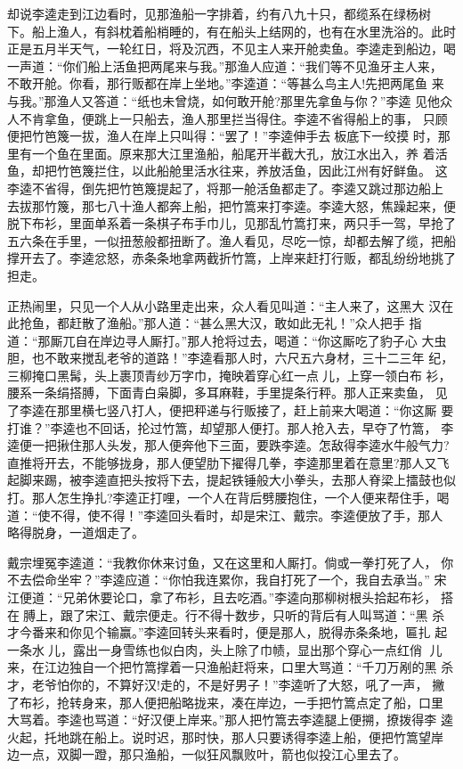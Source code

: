 却说李逵走到江边看时，见那渔船一字排着，约有八九十只，都缆系在绿杨树
下。船上渔人，有斜枕着船梢睡的，有在船头上结网的，也有在水里洗浴的。此时
正是五月半天气，一轮红日，将及沉西，不见主人来开舱卖鱼。李逵走到船边，喝
一声道：“你们船上活鱼把两尾来与我。”那渔人应道：“我们等不见渔牙主人来，
不敢开舱。你看，那行贩都在岸上坐地。”李逵道：“等甚么鸟主人!先把两尾鱼
来与我。”那渔人又答道：“纸也未曾烧，如何敢开舱?那里先拿鱼与你？”李逵
见他众人不肯拿鱼，便跳上一只船去，渔人那里拦当得住。李逵不省得船上的事，
只顾便把竹笆篾一拔，渔人在岸上只叫得：“罢了！”李逵伸手去板底下一绞摸
时，那里有一个鱼在里面。原来那大江里渔船，船尾开半截大孔，放江水出入，养
着活鱼，却把竹笆篾拦住，以此船舱里活水往来，养放活鱼，因此江州有好鲜鱼。
这李逵不省得，倒先把竹笆篾提起了，将那一舱活鱼都走了。李逵又跳过那边船上
去拔那竹篾，那七八十渔人都奔上船，把竹篙来打李逵。李逵大怒，焦躁起来，便
脱下布衫，里面单系着一条棋子布手巾儿，见那乱竹篙打来，两只手一驾，早抢了
五六条在手里，一似扭葱般都扭断了。渔人看见，尽吃一惊，却都去解了缆，把船
撑开去了。李逵忿怒，赤条条地拿两截折竹篙，上岸来赶打行贩，都乱纷纷地挑了
担走。

正热闹里，只见一个人从小路里走出来，众人看见叫道：“主人来了，这黑大
汉在此抢鱼，都赶散了渔船。”那人道：“甚么黑大汉，敢如此无礼！”众人把手
指道：“那厮兀自在岸边寻人厮打。”那人抢将过去，喝道：“你这厮吃了豹子心
大虫胆，也不敢来搅乱老爷的道路！”李逵看那人时，六尺五六身材，三十二三年
纪，三柳掩口黑髯，头上裹顶青纱万字巾，掩映着穿心红一点儿，上穿一领白布
衫，腰系一条绢搭膊，下面青白枭脚，多耳麻鞋，手里提条行秤。那人正来卖鱼，
见了李逵在那里横七竖八打人，便把秤递与行贩接了，赶上前来大喝道：“你这厮
要打谁？”李逵也不回话，抡过竹篙，却望那人便打。那人抢入去，早夺了竹篙，
李逵便一把揪住那人头发，那人便奔他下三面，要跌李逵。怎敌得李逵水牛般气力?
直推将开去，不能够拢身，那人便望肋下擢得几拳，李逵那里着在意里?那人又飞
起脚来踢，被李逵直把头按将下去，提起铁锤般大小拳头，去那人脊梁上擂鼓也似
打。那人怎生挣扎?李逵正打哩，一个人在背后劈腰抱住，一个人便来帮住手，喝
道：“使不得，使不得！”李逵回头看时，却是宋江、戴宗。李逵便放了手，那人
略得脱身，一道烟走了。

戴宗埋冤李逵道：“我教你休来讨鱼，又在这里和人厮打。倘或一拳打死了人，
你不去偿命坐牢？”李逵应道：“你怕我连累你，我自打死了一个，我自去承当。”
宋江便道：“兄弟休要论口，拿了布衫，且去吃酒。”李逵向那柳树根头拾起布衫，
搭在膊上，跟了宋江、戴宗便走。行不得十数步，只听的背后有人叫骂道：“黑
杀才今番来和你见个输赢。”李逵回转头来看时，便是那人，脱得赤条条地，匾扎
起一条水儿，露出一身雪练也似白肉，头上除了巾帻，显出那个穿心一点红俏
儿来，在江边独自一个把竹篙撑着一只渔船赶将来，口里大骂道：“千刀万剐的黑
杀才，老爷怕你的，不算好汉!走的，不是好男子！”李逵听了大怒，吼了一声，
撇了布衫，抢转身来，那人便把船略拢来，凑在岸边，一手把竹篙点定了船，口里
大骂着。李逵也骂道：“好汉便上岸来。”那人把竹篙去李逵腿上便搠，撩拨得李
逵火起，托地跳在船上。说时迟，那时快，那人只要诱得李逵上船，便把竹篙望岸
边一点，双脚一蹬，那只渔船，一似狂风飘败叶，箭也似投江心里去了。

